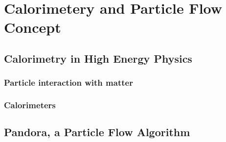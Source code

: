 \chapter{Calorimetery and Particle Flow Concept}

\section{Calorimetry in High Energy Physics}

\subsection{Particle interaction with matter}
\subsection{Calorimeters}

\section{Pandora, a Particle Flow Algorithm}

